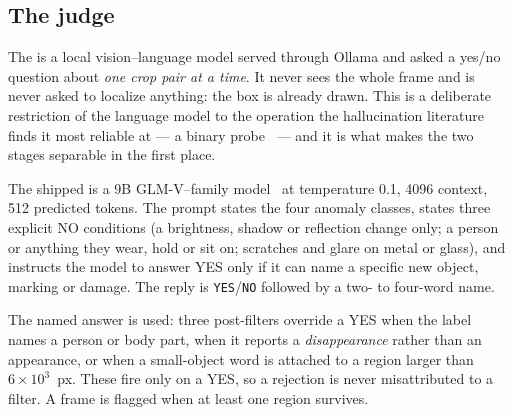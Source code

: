 \subsection{The judge}
\label{sec:method:judge}

The \judge{} is a local vision--language model served through Ollama and asked
a yes/no question about \emph{one crop pair at a time}. It never sees the whole
frame and is never asked to localize anything: the box is already drawn. This
is a deliberate restriction of the language model to the operation the
hallucination literature finds it most reliable at --- a binary
probe~\cite{Li_2023} --- and it is what makes the two stages separable in the
first place.

The shipped \judge{} is a 9B GLM-V--family model~\cite{VTeam_2025_glm45v} at
temperature 0.1, 4096 context, 512 predicted tokens. The prompt states the four
anomaly classes, states three explicit NO conditions (a brightness, shadow or
reflection change only; a person or anything they wear, hold or sit on;
scratches and glare on metal or glass), and instructs the model to answer YES
only if it can name a specific new object, marking or damage. The reply is
\texttt{YES}/\texttt{NO} followed by a two- to four-word name.

The named answer is used: three post-filters override a YES when the label
names a person or body part, when it reports a \emph{disappearance} rather than
an appearance, or when a small-object word is attached to a region larger than
$6\times10^{3}$~px. These fire only on a YES, so a rejection is never
misattributed to a filter. A frame is flagged when at least one region
survives.
